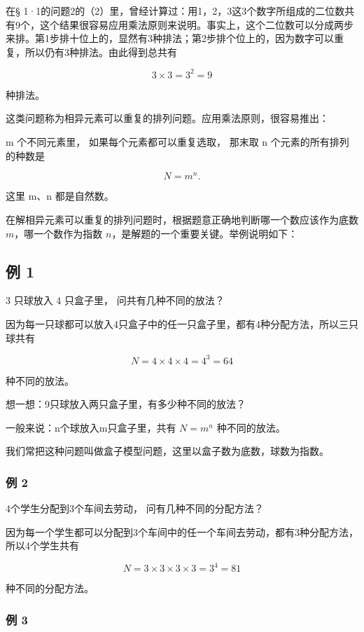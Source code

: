 在§
1·1的问题2的（2）里，曾经计算过：用1，2，3这3个数字所组成的二位数共有9个，这个结果很容易应用乘法原则来说明。事实上，这个二位数可以分成两步来排。第1步排十位上的，显然有3种排法；第2步排个位上的，因为数字可以重复，所以仍有3种排法。由此得到总共有

\[
3 \times 3 = 3 ^ {2} = 9
\]

种排法。

这类问题称为相异元素可以重复的排列问题。应用乘法原则，很容易推出：

m 个不同元素里， 如果每个元素都可以重复选取， 那末取 n
个元素的所有排列的种数是

\[
N = m ^ {n}.
\]

这里 m、n 都是自然数。

在解相异元素可以重复的排列问题时，根据题意正确地判断哪一个数应该作为底数
\(m\)，哪一个数作为指数 \(n\)，是解题的一个重要关键。举例说明如下：

\subsection{例 1}

3 只球放入 4 只盒子里， 问共有几种不同的放法？

因为每一只球都可以放入4只盒子中的任一只盒子里，都有4种分配方法，所以三只球共有

\[
N = 4 \times 4 \times 4 = 4 ^ {3} = 64
\]

种不同的放法。

想一想：9只球放入两只盒子里，有多少种不同的放法？

一般来说：n个球放入m只盒子里，共有 \(N=m^{n}\) 种不同的放法。

我们常把这种问题叫做盒子模型问题，这里以盒子数为底数，球数为指数。

\subsubsection{例 2}

4个学生分配到3个车间去劳动， 问有几种不同的分配方法？

因为每一个学生都可以分配到3个车间中的任一个车间去劳动，都有3种分配方法，所以4个学生共有

\[
N = 3 \times 3 \times 3 \times 3 = 3 ^ {4} = 81
\]

种不同的分配方法。

\subsubsection{例 3}

